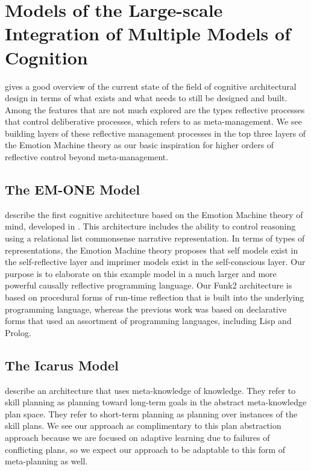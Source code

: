 \section{Models of the Large-scale Integration of Multiple Models of Cognition}

\cite{langley:2008} gives a good overview of the current state of the field of cognitive architectural design in terms of what exists and what needs to still be designed and built.
Among the features that are not much explored are the types reflective processes that control deliberative processes, which \cite{sloman:2001} refers to as meta-management.
We see building layers of these reflective management processes in the top three layers of the Emotion Machine theory as our basic inspiration for higher orders of reflective control beyond meta-management.

\subsection{The EM-ONE Model}

\cite{singh:2005} describe the first cognitive architecture based on the Emotion Machine theory of mind, developed in \cite{minsky:2006}.
This architecture includes the ability to control reasoning using a relational list commonsense narrative representation.
In terms of types of representations, the Emotion Machine theory proposes that self models exist in the self-reflective layer and imprimer models exist in the self-conscious layer.
Our purpose is to elaborate on this example model in a much larger and more powerful causally reflective programming language.
Our Funk2 architecture is based on procedural forms of run-time reflection that is built into the underlying programming language, whereas the previous work was based on declarative forms that used an assortment of programming languages, including Lisp and Prolog.

\subsection{The Icarus Model}

\cite{langley:2005} describe an architecture that uses meta-knowledge of knowledge.
They refer to skill planning as planning toward long-term goals in the abstract meta-knowledge plan space.
They refer to short-term planning as planning over instances of the skill plans.
We see our approach as complimentary to this plan abstraction approach because we are focused on adaptive learning due to failures of conflicting plans, so we expect our approach to be adaptable to this form of meta-planning as well.

